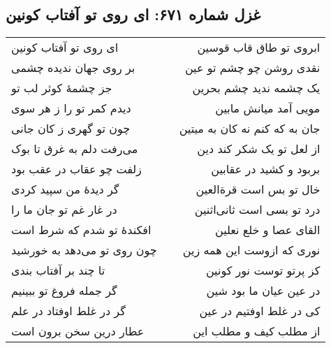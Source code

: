 \begin{center}
\section*{غزل شماره ۶۷۱: ای روی تو آفتاب کونین}
\label{sec:671}
\begin{longtable}{l p{0.5cm} r}
ای روی تو آفتاب کونین
&&
ابروی تو طاق قاب قوسین
\\
بر روی جهان ندیده چشمی
&&
نقدی روشن چو چشم تو عین
\\
جز چشمهٔ کوثر لب تو
&&
یک چشمه ندید چشم بحرین
\\
دیدم کمر تو را ز هر سوی
&&
مویی آمد میانش مابین
\\
چون تو گهری ز کان جانی
&&
جان به که کنم نه کان به میتین
\\
می‌رفت دلم به غرق تا بوک
&&
از لعل تو یک شکر کند دین
\\
زلفت چو عقاب در عقب بود
&&
بربود و کشید در عقابین
\\
گر دیدهٔ من سپید کردی
&&
خال تو بس است قرةالعین
\\
در غار غم تو جان ما را
&&
درد تو بسی است ثانی‌اثنین
\\
افکندهٔ تو شدم که شرط است
&&
القای عصا و خلع نعلین
\\
چون روی تو می‌دهد به خورشید
&&
نوری که ازوست این همه زین
\\
تا چند بر آفتاب بندی
&&
کز پرتو توست نور کونین
\\
گر جمله فروغ تو ببینیم
&&
در عین عیان ما بود شین
\\
گر در غلط اوفتاد در علم
&&
کی در غلط اوفتیم در عین
\\
عطار درین سخن برون است
&&
از مطلب کیف و مطلب این
\\
\end{longtable}
\end{center}
